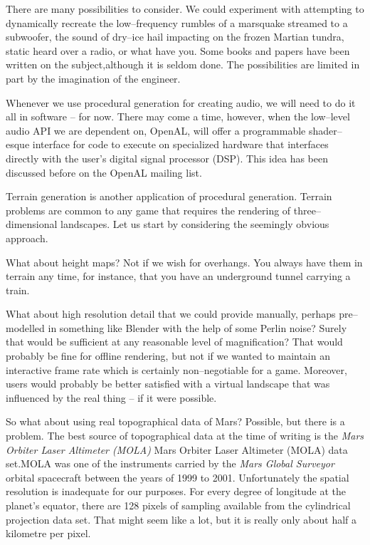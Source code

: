 There are many possibilities to consider. We could experiment with attempting to dynamically recreate the low--frequency rumbles of a marsquake streamed to a subwoofer, the sound of dry--ice hail impacting on the frozen Martian tundra, static heard over a radio, or what have you. Some books and papers have been written on the subject, although it is seldom done. The possibilities are limited in part by the imagination of the engineer.

Whenever we use procedural generation for creating audio, we will need to do it all in software -- for now. There may come a time, however, when the low--level audio API we are dependent on, OpenAL, will offer a programmable shader--esque interface for code to execute on specialized hardware that interfaces directly with the user's digital signal processor (DSP). This idea has been discussed before on the OpenAL mailing list.

Terrain generation is another application of procedural generation. Terrain problems are common to any game that requires the rendering of three--dimensional landscapes. Let us start by considering the seemingly obvious approach.

What about height maps? Not if we wish for overhangs. You always have them in terrain any time, for instance, that you have an underground tunnel carrying a train.

What about high resolution detail that we could provide manually, perhaps pre--modelled in something like Blender with the help of some Perlin noise? Surely that would be sufficient at any reasonable level of magnification? That would probably be fine for offline rendering, but not if we wanted to maintain an interactive frame rate which is certainly non--negotiable for a game. Moreover, users would probably be better satisfied with a virtual landscape that was influenced by the real thing -- if it were possible.

So what about using real topographical data of Mars? Possible, but there is a problem. The best source of topographical data at the time of writing is the {\it Mars Orbiter Laser Altimeter (MOLA)}
{Mars Orbiter Laser Altimeter (MOLA)} data set.\footnotecite[mola] MOLA was one of the instruments carried by the {\it Mars Global Surveyor} orbital spacecraft between the years of 1999 to 2001. Unfortunately the spatial resolution is inadequate for our purposes. For every degree of longitude at the planet's equator, there are 128 pixels of sampling available from the cylindrical projection data set. That might seem like a lot, but it is really only about half a kilometre per pixel.

